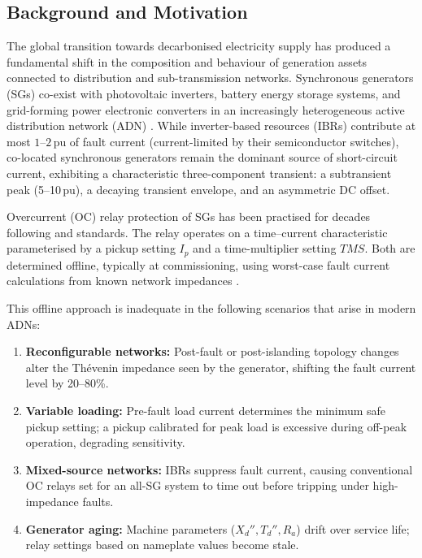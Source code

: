 \documentclass[12pt, a4paper]{article}
\theoremstyle{definition}
\theoremstyle{plain}
\newcommand{\pu}{\,\text{pu}}
\begin{document}
\subsection{Background and Motivation}
\label{sec:intro:background}

The global transition towards decarbonised electricity supply has produced a
fundamental shift in the composition and behaviour of generation assets
connected to distribution and sub-transmission networks.  Synchronous
generators (SGs) co-exist with photovoltaic inverters, battery energy storage
systems, and grid-forming power electronic converters in an increasingly
heterogeneous active distribution network (ADN)
\citep{Hatziargyriou2007,Rocabert2012}.  While inverter-based resources (IBRs)
contribute at most $1$--$2\pu$ of fault current (current-limited by their
semiconductor switches), co-located synchronous generators remain the dominant
source of short-circuit current, exhibiting a characteristic three-component
transient: a subtransient peak (5--10$\pu$), a decaying transient envelope,
and an asymmetric DC offset.

Overcurrent (OC) relay protection of SGs has been practised for decades
following \citet{IEC60255-151} and \citet{IEEEC37112} standards.  The relay
operates on a time--current characteristic parameterised by a pickup setting
$I_p$ and a time-multiplier setting $TMS$.  Both are determined offline,
typically at commissioning, using worst-case fault current calculations from
known network impedances \citep{Blackburn2006}.

This offline approach is inadequate in the following scenarios that arise in
modern ADNs:
\begin{enumerate}
  \item \textbf{Reconfigurable networks:} Post-fault or post-islanding topology
        changes alter the Th\'{e}venin impedance seen by the generator, shifting
        the fault current level by 20--80\%.
  \item \textbf{Variable loading:} Pre-fault load current determines the
        minimum safe pickup setting; a pickup calibrated for peak load is
        excessive during off-peak operation, degrading sensitivity.
  \item \textbf{Mixed-source networks:} IBRs suppress fault current, causing
        conventional OC relays set for an all-SG system to time out before
        tripping under high-impedance faults.
  \item \textbf{Generator aging:} Machine parameters ($X_d'', T_d'', R_a$)
        drift over service life; relay settings based on nameplate values
        become stale.
\end{enumerate}
\end{document}
